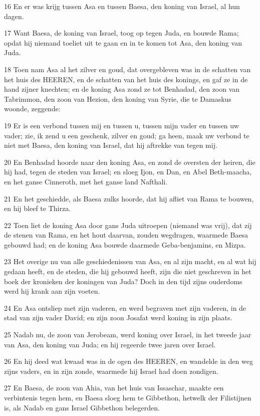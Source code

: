\par 16 En er was krijg tussen Asa en tussen Baesa, den koning van Israel, al hun dagen.
\par 17 Want Baesa, de koning van Israel, toog op tegen Juda, en bouwde Rama; opdat hij niemand toeliet uit te gaan en in te komen tot Asa, den koning van Juda.
\par 18 Toen nam Asa al het zilver en goud, dat overgebleven was in de schatten van het huis des HEEREN, en de schatten van het huis des konings, en gaf ze in de hand zijner knechten; en de koning Asa zond ze tot Benhadad, den zoon van Tabrimmon, den zoon van Hezion, den koning van Syrie, die te Damaskus woonde, zeggende:
\par 19 Er is een verbond tussen mij en tussen u, tussen mijn vader en tussen uw vader; zie, ik zend u een geschenk, zilver en goud; ga heen, maak uw verbond te niet met Baesa, den koning van Israel, dat hij aftrekke van tegen mij.
\par 20 En Benhadad hoorde naar den koning Asa, en zond de oversten der heiren, die hij had, tegen de steden van Israel; en sloeg Ijon, en Dan, en Abel Beth-maacha, en het ganse Cinneroth, met het ganse land Nafthali.
\par 21 En het geschiedde, als Baesa zulks hoorde, dat hij afliet van Rama te bouwen, en hij bleef te Thirza.
\par 22 Toen liet de koning Asa door gans Juda uitroepen (niemand was vrij), dat zij de stenen van Rama, en het hout daarvan, zouden wegdragen, waarmede Baesa gebouwd had; en de koning Asa bouwde daarmede Geba-benjamins, en Mizpa.
\par 23 Het overige nu van alle geschiedenissen van Asa, en al zijn macht, en al wat hij gedaan heeft, en de steden, die hij gebouwd heeft, zijn die niet geschreven in het boek der kronieken der koningen van Juda? Doch in den tijd zijns ouderdoms werd hij krank aan zijn voeten.
\par 24 En Asa ontsliep met zijn vaderen, en werd begraven met zijn vaderen, in de stad van zijn vader David; en zijn zoon Josafat werd koning in zijn plaats.
\par 25 Nadab nu, de zoon van Jerobeam, werd koning over Israel, in het tweede jaar van Asa, den koning van Juda; en hij regeerde twee jaren over Israel.
\par 26 En hij deed wat kwaad was in de ogen des HEEREN, en wandelde in den weg zijns vaders, en in zijn zonde, waarmede hij Israel had doen zondigen.
\par 27 En Baesa, de zoon van Ahia, van het huis van Issaschar, maakte een verbintenis tegen hem, en Baesa sloeg hem te Gibbethon, hetwelk der Filistijnen is, als Nadab en gans Israel Gibbethon belegerden.
